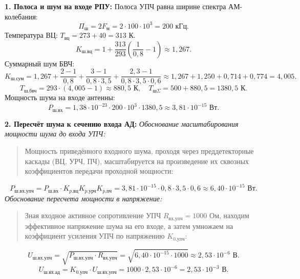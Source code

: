 \documentclass[12pt,a4paper]{article}
\begin{document}
\textbf{1. Полоса и шум на входе РПУ:}
Полоса УПЧ равна ширине спектра АМ-колебания:
\begin{equation}
\Pi_{\text{ш}} = 2 F_{\text{м}} = 2 \cdot 100 \cdot 10^3 = 200\text{ кГц}.
\end{equation}
Температура ВЦ: $T_{\text{вц}} = 273 + 40 = 313\text{ К}$.
\begin{equation}
K_{\text{ш.вц}} = 1 + \frac{313}{293} \left( \frac{1}{0{,}8} - 1 \right) \approx 1{,}267.
\end{equation}
Суммарный шум БВЧ:
\begin{equation}
K_{\text{ш.сум}} = 1{,}267 + \frac{2 - 1}{0{,}8} + \frac{3 - 1}{0{,}8 \cdot 3{,}5} + \frac{2{,}3 - 1}{0{,}8 \cdot 3{,}5 \cdot 0{,}6} \approx 1{,}267 + 1{,}250 + 0{,}714 + 0{,}774 = 4{,}005.
\end{equation}
\begin{equation}
T_{\text{ш.бвч}} = 293 \cdot (4{,}005 - 1) \approx 880{,}5\text{ К}, \quad T_{\text{ш}\Sigma} = 500 + 880{,}5 = 1380{,}5\text{ К}.
\end{equation}
Мощность шума на входе антенны:
\begin{equation}
P_{\text{ш.вх}} = 1{,}38 \cdot 10^{-23} \cdot 200 \cdot 10^3 \cdot 1380{,}5 \approx 3{,}81 \cdot 10^{-15}\text{ Вт}.
\end{equation}

\textbf{2. Пересчёт шума к сечению входа АД:}
\textit{Обоснование масштабирования мощности шума до входа УПЧ:}
\begin{quote}
Мощность приведённого входного шума, проходя через преддетекторные каскады (ВЦ, УРЧ, ПЧ), масштабируется на произведение их сквозных коэффициентов передачи проходной мощности:
\end{quote}
\begin{equation}
P_{\text{ш.вх.упч}} = P_{\text{ш.вх}} \cdot K_{p.\text{вц}} K_{p.\text{урч}} K_{p.\text{пч}} = 3{,}81 \cdot 10^{-15} \cdot 0{,}8 \cdot 3{,}5 \cdot 0{,}6 \approx 6{,}40 \cdot 10^{-15}\text{ Вт}.
\end{equation}
\textit{Обоснование пересчета мощности в напряжение:}
\begin{quote}
Зная входное активное сопротивление УПЧ $R_{\text{вх.упч}} = 1000\text{ Ом}$, находим эффективное напряжение шума на его входе, а затем умножаем на коэффициент усиления УПЧ по напряжению $K_{0.\text{упч}}$:
\end{quote}
\begin{equation}
U_{\text{ш.вх.упч}} = \sqrt{P_{\text{ш.вх.упч}} \cdot R_{\text{вх.упч}}} = \sqrt{6{,}40 \cdot 10^{-15} \cdot 1000} \approx 2{,}53 \cdot 10^{-6}\text{ В}.
\end{equation}
\begin{equation}
U_{\text{ш.вх.ад}} = K_{0.\text{упч}} \cdot U_{\text{ш.вх.упч}} = 1000 \cdot 2{,}53 \cdot 10^{-6} = 2{,}53 \cdot 10^{-3}\text{ В}.
\end{equation}
\end{document}
